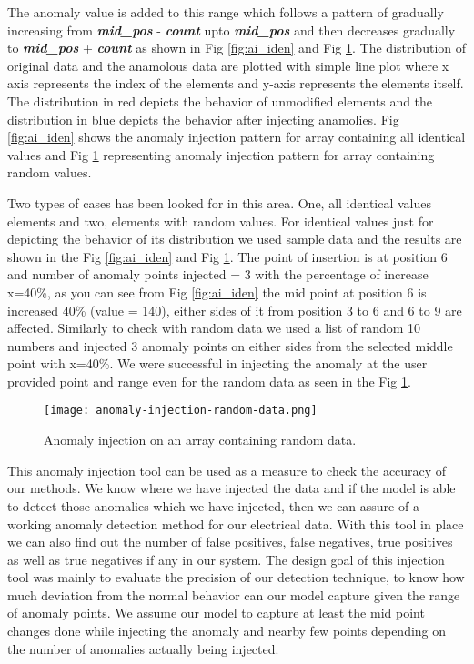 The anomaly value is added to this range which follows a pattern of gradually increasing  from \textbf{\textit{mid\_pos}} - \textbf{\textit{count}} upto \textbf{\textit{mid\_pos}}  and then decreases gradually to   \textbf{\textit{mid\_pos}} + \textbf{\textit{count}} as shown in Fig \ref{fig:ai_iden} and  Fig \ref{fig:ai_rd}.  The distribution of original data and the anamolous data are plotted with simple line plot where x axis represents the index of the elements and y-axis represents the elements itself. The distribution in red depicts the behavior of unmodified elements and the distribution in blue depicts the behavior after injecting anamolies. Fig \ref{fig:ai_iden} shows the anomaly injection pattern for array containing all identical values and Fig \ref{fig:ai_rd} representing anomaly injection pattern for array containing random values. 

Two types of cases has been looked for in this area. One, all identical values elements and two, elements with random values. For identical values just for depicting the behavior of its distribution we used sample data and the results are shown in the Fig \ref{fig:ai_iden} and  Fig \ref{fig:ai_rd}. The point of insertion is at position 6 and number of anomaly points injected = 3 with the percentage of increase x=40\%, as you can see from Fig \ref{fig:ai_iden} the mid point at position 6 is increased 40\% (value = 140), either sides of it from position 3 to 6 and 6 to 9 are affected. Similarly to check with random data we used a list of random 10 numbers and injected 3 anomaly points on either sides from the selected middle point with x=40\%. We were successful in injecting the anomaly at the user provided point and range even for the random data as seen in the Fig \ref{fig:ai_rd}. 
\begin{figure}
\centerline{\texttt{[image: anomaly-injection-random-data.png]}}
    \caption{Anomaly injection on an array containing random data.}
    \label{fig:ai_rd}
\end{figure}

This anomaly injection tool can be used as a measure to check the accuracy of our methods. We know where we have injected the data and if the model is able to detect those anomalies which we have injected, then we can assure of a working anomaly detection method for our electrical data. With this tool in place we can also find out the number of false positives, false negatives, true positives as well as true negatives if any in our system. The design goal of this injection tool was mainly to evaluate the precision of our detection technique, to know how much deviation from the normal behavior can our model capture given the range of anomaly points. We assume our model to capture at least the mid point changes done while injecting the anomaly and nearby few points depending on the number of anomalies actually being injected.\\

